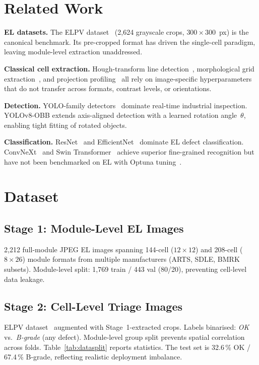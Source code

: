 \documentclass[conference]{IEEEtran}
\begin{document}
\section{Related Work}
\label{sec:related}

\textbf{EL datasets.} The ELPV dataset~\cite{deitsch2019} (2{,}624 grayscale crops, $300\times300$~px) is the canonical benchmark. Its pre-cropped format has driven the single-cell paradigm, leaving module-level extraction unaddressed.

\textbf{Classical cell extraction.} Hough-transform line detection~\cite{duda1972}, morphological grid extraction~\cite{soille2003}, and projection profiling~\cite{wong1982} all rely on image-specific hyperparameters that do not transfer across formats, contrast levels, or orientations.

\textbf{Detection.} YOLO-family detectors~\cite{redmon2016,jocher2023} dominate real-time industrial inspection. YOLOv8-OBB extends axis-aligned detection with a learned rotation angle~$\theta$, enabling tight fitting of rotated objects.

\textbf{Classification.} ResNet~\cite{he2016} and EfficientNet~\cite{tan2019} dominate EL defect classification. ConvNeXt~\cite{liu2022} and Swin Transformer~\cite{liu2021} achieve superior fine-grained recognition but have not been benchmarked on EL with Optuna tuning~\cite{akiba2019}.

\section{Dataset}
\label{sec:dataset}

\subsection{Stage 1: Module-Level EL Images}
2{,}212 full-module JPEG EL images spanning 144-cell ($12\times12$) and 208-cell ($8\times26$) module formats from multiple manufacturers (ARTS, SDLE, BMRK subsets). Module-level split: 1{,}769 train / 443 val (80/20), preventing cell-level data leakage.

\subsection{Stage 2: Cell-Level Triage Images}
ELPV dataset~\cite{deitsch2019} augmented with Stage~1-extracted crops. Labels binarised: \textit{OK} vs.\ \textit{B-grade} (any defect). Module-level group split prevents spatial correlation across folds. Table~\ref{tab:datasplit} reports statistics. The test set is 32.6\,\% OK / 67.4\,\% B-grade, reflecting realistic deployment imbalance.
\end{document}
